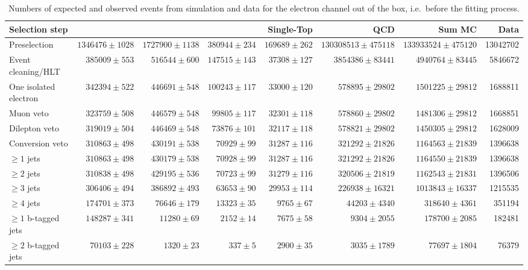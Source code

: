 \begin{table}
  \centering
   \caption{Numbers of expected and observed events from simulation and data
   for the electron channel out of the box, i.e.\ before the fitting process.}
    \label{tab:event_yields_ejets}
    \resizebox{\columnwidth}{!} {
    \begin{tabular}{lrrrrrrr}
    \toprule
	\textbf{Selection step} & \textbf{\ttjets} & \textbf{\WpJets} & \textbf{\ZpJets} & \textbf{Single-Top} & \textbf{QCD} & \textbf{Sum MC} & \textbf{Data} \\
	\midrule
	Preselection  &  $1346476 \pm 1028$ &  $1727900 \pm 1138$ &  $380944 \pm 234$ &  $169689 \pm 262$ &  $130308513 \pm 475118$ &  $133933524 \pm 475120$ &  13042702 \\ 
	Event cleaning/HLT  &  $385009 \pm 553$ &  $516544 \pm 600$ &  $147515 \pm 143$ &  $37308 \pm 127$ &  $3854386 \pm 83441$ &  $4940764 \pm 83445$ &  5846672 \\ 
	One isolated electron  &  $342394 \pm 522$ &  $446691 \pm 548$ &  $100243 \pm 117$ &  $33000 \pm 120$ &  $578895 \pm 29802$ &  $1501225 \pm 29812$ &  1688811 \\ 
	Muon veto  &  $323759 \pm 508$ &  $446579 \pm 548$ &  $99805 \pm 117$ &  $32301 \pm 118$ &  $578860 \pm 29802$ &  $1481306 \pm 29812$ &  1668851 \\ 
	Dilepton veto  &  $319019 \pm 504$ &  $446469 \pm 548$ &  $73876 \pm 101$ &  $32117 \pm 118$ &  $578821 \pm 29802$ &  $1450305 \pm 29812$ &  1628009 \\ 
	Conversion veto  &  $310863 \pm 498$ &  $430191 \pm 538$ &  $70929 \pm 99$ &  $31287 \pm 116$ &  $321292 \pm 21826$ &  $1164563 \pm 21839$ &  1396638 \\ 
	$\geq 1$ jets  &  $310863 \pm 498$ &  $430179 \pm 538$ &  $70928 \pm 99$ &  $31287 \pm 116$ &  $321292 \pm 21826$ &  $1164550 \pm 21839$ &  1396638 \\ 
	$\geq 2$ jets  &  $310838 \pm 498$ &  $429195 \pm 536$ &  $70723 \pm 99$ &  $31279 \pm 116$ &  $320506 \pm 21819$ &  $1162543 \pm 21831$ &  1396506 \\ 
	$\geq 3$ jets  &  $306406 \pm 494$ &  $386892 \pm 493$ &  $63653 \pm 90$ &  $29953 \pm 114$ &  $226938 \pm 16321$ &  $1013843 \pm 16337$ &  1215535 \\ 
	$\geq 4$ jets  &  $174701 \pm 373$ &  $76646 \pm 179$ &  $13323 \pm 35$ &  $9765 \pm 67$ &  $44203 \pm 4340$ &  $318640 \pm 4361$ &  351194 \\ 
	$\geq 1$ b-tagged jets  &  $148287 \pm 341$ &  $11280 \pm 69$ &  $2152 \pm 14$ &  $7675 \pm 58$ &  $9304 \pm 2055$ &  $178700 \pm 2085$ &  182481 \\ 
	$\geq 2$ b-tagged jets  &  $70103 \pm 228$ &  $1320 \pm 23$ &  $337 \pm 5$ &  $2900 \pm 35$ &  $3035 \pm 1789$ &  $77697 \pm 1804$ &  76379 \\ 
	\bottomrule
	\end{tabular}
	}
\end{table}

